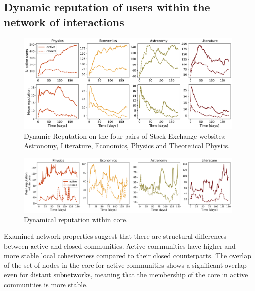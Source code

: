 \subsection{Dynamic reputation of users within the network of interactions}

\begin{figure}
	\centering
	\includegraphics[width=\linewidth]{figures/stackexchange/reputation.pdf}
	\caption{Dynamic Reputation on the four pairs of Stack Exchange websites: Astronomy, Literature, Economics,  Physics and Theoretical Physics.}
	\label{fig:dr6panel}
\end{figure}

\begin{figure}
	\centering
	\includegraphics[width=\linewidth]{figures/stackexchange/core_reputation.pdf}
	\caption{Dynamical reputation within core.}
	\label{fig:dr_core}
\end{figure}

Examined network properties suggest that there are structural differences between active and closed communities. Active communities have higher and more stable local cohesiveness compared to their closed counterparts. The overlap of the set of nodes in the core for active communities shows a significant overlap even for distant subnetworks, meaning that the membership of the core in active communities is more stable.

